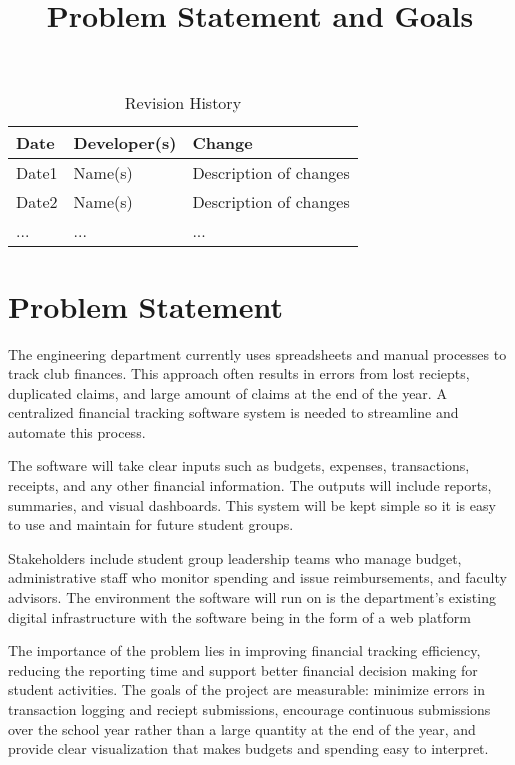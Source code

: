 \documentclass{article}
\title{Problem Statement and Goals\\\progname}
\author{\authname}
\date{}
\begin{document}
\maketitle

\begin{table}[hp]
\caption{Revision History} \label{TblRevisionHistory}
\begin{tabularx}{\textwidth}{llX}
\toprule
\textbf{Date} & \textbf{Developer(s)} & \textbf{Change}\\
\midrule
Date1 & Name(s) & Description of changes\\
Date2 & Name(s) & Description of changes\\
... & ... & ...\\
\bottomrule
\end{tabularx}
\end{table}

\section{Problem Statement}

The engineering department currently uses spreadsheets and manual processes to track club finances. This approach
often results in errors from lost reciepts, duplicated claims, and large amount of claims at the end of the year. A centralized
financial tracking software system is needed to streamline and automate this process.

The software will take clear inputs such as budgets, expenses, transactions, receipts, and any other financial
information. The outputs will include reports, summaries, and visual dashboards. This system will be kept simple
so it is easy to use and maintain for future student groups.

Stakeholders include student group leadership teams who manage budget, administrative staff who monitor spending and 
issue reimbursements, and faculty advisors. The environment the software will run on is the department's existing digital 
infrastructure with the software being in the form of a web platform

The importance of the problem lies in improving financial tracking efficiency, reducing the reporting time
and support better financial decision making for student activities. The goals of the project are measurable: minimize
errors in transaction logging and reciept submissions, encourage continuous submissions over the school year rather than 
a large quantity at the end of the year, and provide clear visualization that makes budgets and spending easy to interpret.
\end{document}
